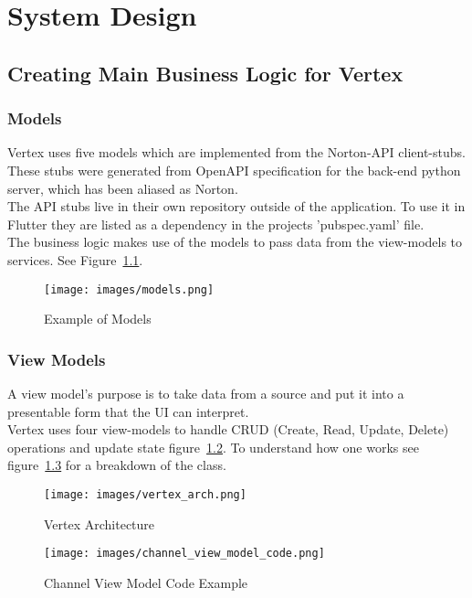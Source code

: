 \chapter{System Design}
\section{Creating Main Business Logic for Vertex}
\subsection{Models}
Vertex uses five models which are implemented from the Norton-API client-stubs. These stubs were generated from OpenAPI specification for the back-end python server, which has been aliased as Norton.
\\ The API stubs live in their own repository outside of the application. To use it in Flutter they are listed as a dependency in the projects 'pubspec.yaml' file.
\\ The business logic makes use of the models to pass data from the view-models to services.
See Figure~\ref{image:models}.

\begin{figure}[h!]
    \caption{Example of Models}
    \label{image:models}
    \centering
    \texttt{[image: images/models.png]}
\end{figure}

\subsection{View Models}
A view model's purpose is to take data from a source and put it into a presentable form that the UI can interpret.
\\ Vertex uses four view-models to handle CRUD (Create, Read, Update, Delete) operations and update state figure~\ref{image:vertexArch}. To understand how one works see figure~\ref{image:channelViewModel} for a breakdown of the class.

\begin{figure}[h!]
    \caption{Vertex Architecture}
    \label{image:vertexArch}
    \centering
    \texttt{[image: images/vertex\_arch.png]}
\end{figure}

\begin{figure}[h!]
    \caption{Channel View Model Code Example}
    \label{image:channelViewModel}
    \centering
    \texttt{[image: images/channel\_view\_model\_code.png]}
\end{figure}

